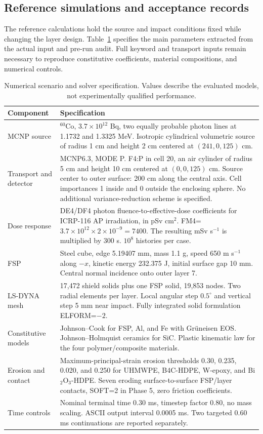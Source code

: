 \subsection{Reference simulations and acceptance records}
The reference calculations hold the source and impact conditions fixed while changing the layer design. Table~\ref{tab:physical} specifies the main parameters extracted from the actual input and pre-run audit. Full keyword and transport inputs remain necessary to reproduce constitutive coefficients, material compositions, and numerical controls.
\begin{table}[htbp]\centering\small
\caption{Numerical scenario and solver specification. Values describe the evaluated models, not experimentally qualified performance.}\label{tab:physical}
\begin{tabular}{@{}p{.27\linewidth}p{.66\linewidth}@{}}\toprule
Component & Specification\\\midrule
MCNP source & $^{60}$Co, $3.7\times10^{12}$ Bq, two equally probable photon lines at 1.1732 and 1.3325 MeV. Isotropic cylindrical volumetric source of radius 1 cm and height 2 cm centered at $(241,0,125)$ cm.\\
Transport and detector & MCNP6.3, MODE P. F4:P in cell 20, an air cylinder of radius 5 cm and height 10 cm centered at $(0,0,125)$ cm. Source center to outer surface: 200 cm along the central axis. Cell importances 1 inside and 0 outside the enclosing sphere. No additional variance-reduction scheme is specified.\\
Dose response & DE4/DF4 photon fluence-to-effective-dose coefficients for ICRP-116 AP irradiation, in pSv cm$^2$. FM4=$3.7\times10^{12}\times2\times10^{-9}=7400$. The resulting mSv s$^{-1}$ is multiplied by 300 s. $10^8$ histories per case.\\
FSP & Steel cube, edge 5.19407 mm, mass 1.1 g, speed 650 m s$^{-1}$ along $-x$, kinetic energy 232.375 J, initial surface gap 10 mm. Central normal incidence onto outer layer 7.\\
LS-DYNA mesh & 17,472 shield solids plus one FSP solid, 19,853 nodes. Two radial elements per layer. Local angular step $0.5^{\circ}$ and vertical step 5 mm near impact. Fully integrated solid formulation ELFORM=$-2$.\\
Constitutive models & Johnson--Cook for FSP, Al, and Fe with Gr\"uneisen EOS. Johnson--Holmquist ceramics for SiC. Plastic kinematic law for the four polymer/composite materials.\\
Erosion and contact & Maximum-principal-strain erosion thresholds 0.30, 0.235, 0.020, and 0.250 for UHMWPE, B4C-HDPE, W-epoxy, and Bi$_2$O$_3$-HDPE. Seven eroding surface-to-surface FSP/layer contacts, SOFT=2 in Phase 5, zero friction coefficients.\\
Time controls & Nominal terminal time 0.30 ms, timestep factor 0.80, no mass scaling. ASCII output interval 0.0005 ms. Two targeted 0.60 ms continuations are reported separately.\\\bottomrule
\end{tabular}\end{table}
